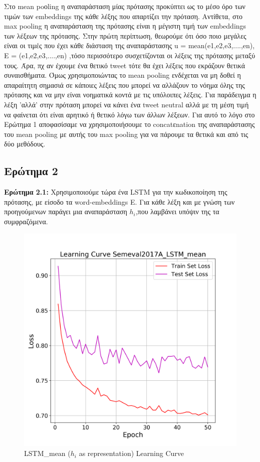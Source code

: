 \documentclass[12pt]{article}
\begin{document}
Στο mean poοling η αναπαράσταση μίας πρότασης προκύπτει ως το μέσο όρο των τιμών των embeddings της κάθε λέξης που απαρτίζει την πρόταση. Αντίθετα, στο max pooling η αναπαράσταση της πρότασης είναι η μέγιστη τιμή των embeddings των λέξεων της πρότασης. Στην πρώτη περίπτωση, θεωρούμε ότι όσο ποιο μεγάλες είναι οι τιμές που έχει κάθε διάσταση της αναπαράστασης u = mean(e1,e2,e3,....,en), E = (e1,e2,e3,....,en) ,τόσο περισσότερο συσχετίζονται οι λέξεις της πρότασης μεταξύ τους. Άρα, πχ αν έχουμε ένα θετικό tweet τότε θα έχει λέξεις που εκράζουν θετικά συναισθήματα. Όμως χρησιμοποιώντας το mean pooling ενδέχεται να μη δοθεί η απαραίτητη σημασιά σε κάποιες λέξεις που μπορεί να αλλάζουν το νόημα όλης της πρότασης και να μην είναι νοηματικά κοντά με τις υπόλοιπες λέξεις. Για παράδειγμα η λέξη 'αλλά' στην πρόταση μπορεί να κάνει ένα tweet neutral αλλά με τη μέση τιμή να φαίνεται ότι είναι αρητικό ή θετικό λόγω των άλλων λέξεων. Για αυτό το λόγο στο Ερώτημα 1 αποφασίσαμε να χρησιμοποιήσουμε το concatεnation της αναπαράστασης του mean pooling με αυτής του max pooling για να πάρουμε τα θετικά και από τις δύο μεθόδους.  



\subsection{Ερώτημα 2}
\textbf{Ερώτημα 2.1:}
Χρησιμοποιούμε τώρα ένα LSTM για την κωδικοποίηση της πρότασης, με είσοδο τα word-embeddings E. Για κάθε λέξη και με γνώση των προηγούμενων παράγει μια αναπαράσταση $h_i$,που λαμβάνει υπόψιν της τα συμφραζόμενα.

\begin{figure}[h!]
	\centering
	\includegraphics[width=0.6\linewidth]{./img/Semeval2017A/LSTM_mean_loss}
	\caption{LSTM\_mean ($h_i$ as representation) Learning Curve}
	\label{fig:sin}
\end{figure}
\end{document}

